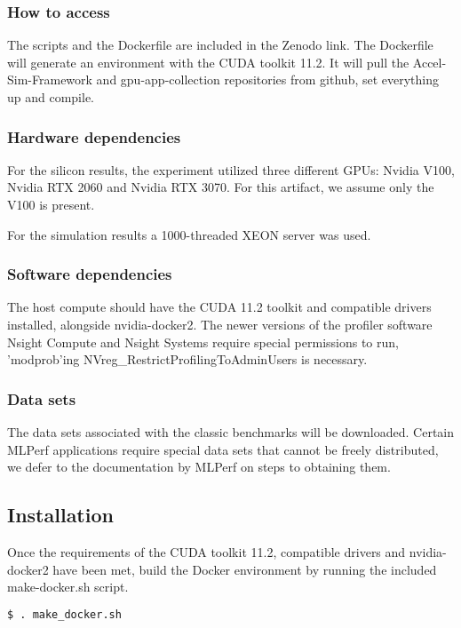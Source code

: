 \documentclass{sigplanconf}
\begin{document}
{\subsubsection{How to access}

The scripts and the Dockerfile are included in the Zenodo link. The Dockerfile will
generate an environment with the CUDA toolkit 11.2. It will pull the Accel-Sim-Framework and
gpu-app-collection repositories from github, set everything up and compile.

\subsubsection{Hardware dependencies}
For the silicon results, the experiment utilized three different GPUs: Nvidia V100, Nvidia RTX 2060 and Nvidia RTX 3070.
For this artifact, we assume only the V100 is present.

For the simulation results a 1000-threaded XEON server was used. 

\subsubsection{Software dependencies}
The host compute should have the CUDA 11.2 toolkit and compatible drivers installed, alongside nvidia-docker2.
The newer versions of the profiler software Nsight Compute and Nsight Systems require special permissions to 
run, 'modprob'ing NVreg\_RestrictProfilingToAdminUsers is necessary.

\subsubsection{Data sets}
The data sets associated with the classic benchmarks will be downloaded. Certain MLPerf applications require special
data sets that cannot be freely distributed, we defer to the documentation by MLPerf on steps to obtaining them.  

\subsection{Installation}

Once the requirements of the CUDA toolkit 11.2, compatible drivers and
nvidia-docker2 have been met, build the Docker environment by running the
included make-docker.sh script.

\begin{lstlisting}[language=bash]
  $ . make_docker.sh
\end{lstlisting}

}
\end{document}
